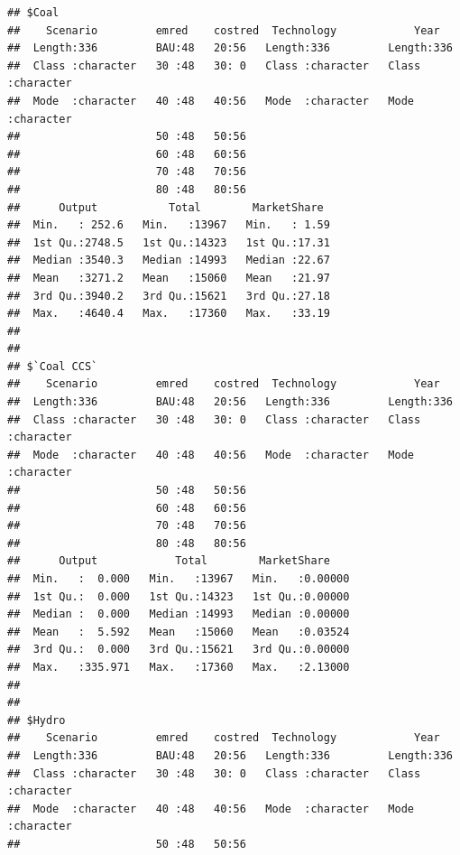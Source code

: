 \documentclass[]{article}
\begin{document}
\begin{verbatim}
## $Coal
##    Scenario         emred    costred  Technology            Year          
##  Length:336         BAU:48   20:56   Length:336         Length:336        
##  Class :character   30 :48   30: 0   Class :character   Class :character  
##  Mode  :character   40 :48   40:56   Mode  :character   Mode  :character  
##                     50 :48   50:56                                        
##                     60 :48   60:56                                        
##                     70 :48   70:56                                        
##                     80 :48   80:56                                        
##      Output           Total        MarketShare   
##  Min.   : 252.6   Min.   :13967   Min.   : 1.59  
##  1st Qu.:2748.5   1st Qu.:14323   1st Qu.:17.31  
##  Median :3540.3   Median :14993   Median :22.67  
##  Mean   :3271.2   Mean   :15060   Mean   :21.97  
##  3rd Qu.:3940.2   3rd Qu.:15621   3rd Qu.:27.18  
##  Max.   :4640.4   Max.   :17360   Max.   :33.19  
##                                                  
## 
## $`Coal CCS`
##    Scenario         emred    costred  Technology            Year          
##  Length:336         BAU:48   20:56   Length:336         Length:336        
##  Class :character   30 :48   30: 0   Class :character   Class :character  
##  Mode  :character   40 :48   40:56   Mode  :character   Mode  :character  
##                     50 :48   50:56                                        
##                     60 :48   60:56                                        
##                     70 :48   70:56                                        
##                     80 :48   80:56                                        
##      Output            Total        MarketShare     
##  Min.   :  0.000   Min.   :13967   Min.   :0.00000  
##  1st Qu.:  0.000   1st Qu.:14323   1st Qu.:0.00000  
##  Median :  0.000   Median :14993   Median :0.00000  
##  Mean   :  5.592   Mean   :15060   Mean   :0.03524  
##  3rd Qu.:  0.000   3rd Qu.:15621   3rd Qu.:0.00000  
##  Max.   :335.971   Max.   :17360   Max.   :2.13000  
##                                                     
## 
## $Hydro
##    Scenario         emred    costred  Technology            Year          
##  Length:336         BAU:48   20:56   Length:336         Length:336        
##  Class :character   30 :48   30: 0   Class :character   Class :character  
##  Mode  :character   40 :48   40:56   Mode  :character   Mode  :character  
##                     50 :48   50:56                                        

\end{verbatim}
\end{document}
